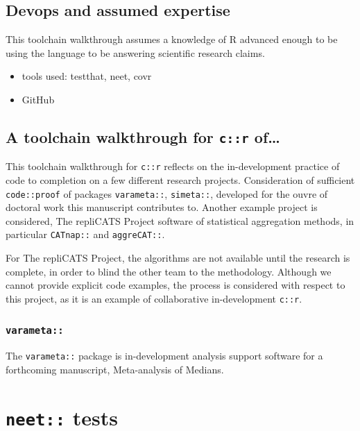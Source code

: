 \documentclass[
]{article}
\providecommand{\tightlist}{%
  \setlength{\itemsep}{0pt}\setlength{\parskip}{0pt}}
\begin{document}
\hypertarget{devops-and-assumed-expertise}{%
\subsection{Devops and assumed
expertise}\label{devops-and-assumed-expertise}}

This toolchain walkthrough assumes a knowledge of R advanced enough to
be using the language to be answering scientific research claims.

\begin{itemize}
\tightlist
\item
  tools used: testthat, neet, covr
\item
  GitHub
\end{itemize}

\hypertarget{a-toolchain-walkthrough-for-cr-of}{%
\subsection{\texorpdfstring{A toolchain walkthrough for \texttt{c::r}
of\ldots{}}{A toolchain walkthrough for c::r of\ldots{}}}\label{a-toolchain-walkthrough-for-cr-of}}

This toolchain walkthrough for \texttt{c::r} reflects on the
in-development practice of code to completion on a few different
research projects. Consideration of sufficient \texttt{code::proof} of
packages \texttt{varameta::}, \texttt{simeta::}, developed for the ouvre
of doctoral work this manuscript contributes to. Another example project
is considered, The repliCATS Project software of statistical aggregation
methods, in particular \texttt{CATnap::} and \texttt{aggreCAT::}.

For The repliCATS Project, the algorithms are not available until the
research is complete, in order to blind the other team to the
methodology. Although we cannot provide explicit code examples, the
process is considered with respect to this project, as it is an example
of collaborative in-development \texttt{c::r}.

\hypertarget{varameta}{%
\subsubsection{\texorpdfstring{\texttt{varameta::}}{varameta::}}\label{varameta}}

The \texttt{varameta::} package is in-development analysis support
software for a forthcoming manuscript, Meta-analysis of Medians.

\hypertarget{neet-tests}{%
\section{\texorpdfstring{\texttt{neet::}
tests}{neet:: tests}}\label{neet-tests}}
\end{document}
